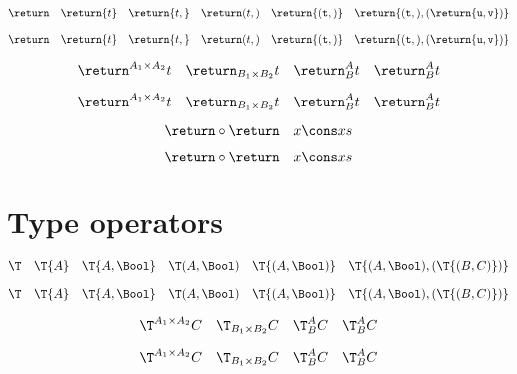 \documentclass{article}
\begin{document}
\begin{verbatim*}
\def\constructorfont{\mathsf}

\DeclareConstructorInfix{\cons}{\dblcolon}
\end{verbatim*}

\begin{verbatim*}
\[
\return\quad
\return{t}\quad
\return{t,\tt}\quad
\return(t,\tt)\quad
\return{{(t,\tt)}}\quad
\return{(t,\tt),(\return{u,v})}
\]
\end{verbatim*}
%
\[
  \return            \quad
  \return{t}         \quad
  \return{t,\tt}     \quad
  \return(t,\tt)     \quad
  \return{{(t,\tt)}} \quad
  \return{(t,\tt),(\return{u,v})}
\]

\begin{verbatim*}
\[
\return^{A_1\times A_2}{t}\quad
\return_{B_1\times B_2}{t}\quad
\return^A_B{t}\quad
\return_B^A{t}
\]
\end{verbatim*}
%
\[
  \return^{A_1 \times A_2}{t} \quad
  \return_{B_1 \times B_2}{t} \quad
  \return^A_B{t}              \quad
  \return_B^A{t}
\]

\begin{verbatim*}
\[
\return \circ \return\quad
x \cons xs
\]
\end{verbatim*}
%
\[
  \return \circ \return\quad
  x \cons xs
\]

\section{Type operators}

\begin{verbatim*}
\def\typefont{\mathsf}

\DeclareTypeInfix{\Sum}{+}
\end{verbatim*}

\begin{verbatim*}
\[
\T\quad
\T{A}\quad
\T{A,\Bool}\quad
\T(A,\Bool)\quad
\T{{(A,\Bool)}}\quad
\T{{(A,\Bool)},(\T{(B,C)})}
\]
\end{verbatim*}
%
\[
  \T              \quad
  \T{A}           \quad
  \T{A,\Bool}     \quad
  \T(A,\Bool)     \quad
  \T{{(A,\Bool)}} \quad
  \T{{(A,\Bool)},(\T{(B,C)})}
\]

\begin{verbatim*}
\[
\T^{A_1\times A_2}{C}\quad
\T_{B_1\times B_2}{C}\quad
\T^A_B{C}\quad
\T_B^A{C}
\]
\end{verbatim*}
%
\[
  \T^{A_1 \times A_2}{C} \quad
  \T_{B_1 \times B_2}{C} \quad
  \T^A_B{C}              \quad
  \T_B^A{C}
\]
\end{document}
